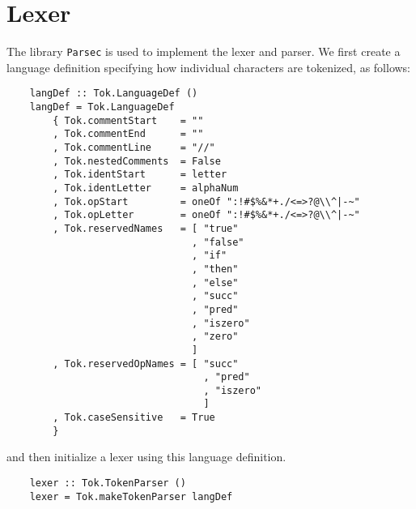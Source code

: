 \section{Lexer}
The library \texttt{Parsec} is used to implement the lexer and parser. 
We first create a language definition specifying how individual characters are tokenized, as follows:
\begin{lstlisting}
    langDef :: Tok.LanguageDef ()
    langDef = Tok.LanguageDef
        { Tok.commentStart    = ""  
        , Tok.commentEnd      = ""
        , Tok.commentLine     = "//"
        , Tok.nestedComments  = False
        , Tok.identStart      = letter 
        , Tok.identLetter     = alphaNum 
        , Tok.opStart         = oneOf ":!#$%&*+./<=>?@\\^|-~"
        , Tok.opLetter        = oneOf ":!#$%&*+./<=>?@\\^|-~"
        , Tok.reservedNames   = [ "true"
                                , "false"
                                , "if"
                                , "then"
                                , "else"
                                , "succ"
                                , "pred"
                                , "iszero"
                                , "zero"
                                ]
        , Tok.reservedOpNames = [ "succ"
                                  , "pred"
                                  , "iszero" 
                                  ]
        , Tok.caseSensitive   = True
        }
\end{lstlisting}
and then initialize a lexer using this language definition.
\begin{lstlisting}
    lexer :: Tok.TokenParser ()
    lexer = Tok.makeTokenParser langDef
\end{lstlisting}

